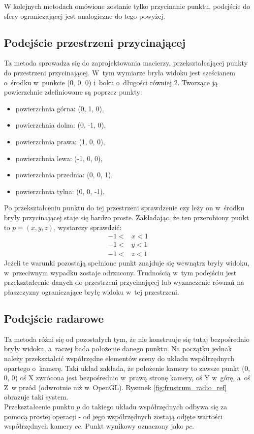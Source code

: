 \documentclass[a4paper,twoside,12pt]{book}
\begin{document}


W kolejnych metodach omówione zostanie tylko przycinanie punktu, podejście do sfery ograniczającej jest analogiczne do tego powyżej.

\subsection{Podejście przestrzeni przycinającej}
Ta metoda sprowadza się do zaprojektowania macierzy, przekształcającej punkty do przestrzeni przycinającej. W~tym wymiarze bryła widoku jest sześcianem o~środku w~punkcie (0, 0, 0) i~boku o~długości równiej 2. Tworzące ją powierzchnie zdefiniowane są poprzez punkty:
\begin{itemize}
    \item powierzchnia górna: (0, 1, 0),
    \item powierzchnia dolna: (0, -1, 0),
    \item powierzchnia prawa: (1, 0, 0),
    \item powierzchnia lewa: (-1, 0, 0),
    \item powierzchnia przednia: (0, 0, 1),
    \item powierzchnia tylna: (0, 0, -1).
\end{itemize}
Po przekształceniu punktu do tej przestrzeni sprawdzenie czy leży on w~środku bryły przycinającej staje się bardzo proste. Zakładając, że ten przerobiony punkt to $p = (x, y, z)$, wystarczy sprawdzić:\\
\begin{align}
-1 < &x < 1 \\
-1 < &y < 1 \\
-1 < &z < 1
\end{align}
Jeżeli te warunki pozostają spełnione punkt znajduje się wewnątrz bryły widoku, w~przeciwnym wypadku zostaje odrzucony. Trudnością w~tym podejściu jest przekształcenie danych do przestrzeni przycinającej lub wyznaczenie równań na płaszczyzny ograniczające bryłę widoku w~tej przestrzeni.

\subsection{Podejście radarowe}
Ta metoda różni się od pozostałych tym, że nie konstruuje się tutaj bezpośrednio bryły widoku, a~raczej bada położenie danego punktu. Na początku jednak należy przekształcić współrzędne elementów sceny do układu współrzędnych opartego o~kamerę. Taki układ zakłada, że położenie kamery to zawsze punkt (0, 0, 0) oś X zwrócona jest bezpośrednio w~prawą stronę kamery, oś Y w~górę, a~oś Z~w przód (odwrotnie niż w~OpenGL). \cite{game_programming_gems5} Rysunek \ref{fig:frustrum_radio_ref} obrazuje taki system. \\
Przekształcenie punktu $p$ do takiego układu współrzędnych odbywa się za pomocą prostej operacji - od jego współrzędnych zostają odjęte wartości współrzędnych kamery $cc$. Punkt wynikowy oznaczony jako $pc$.
\end{document}
